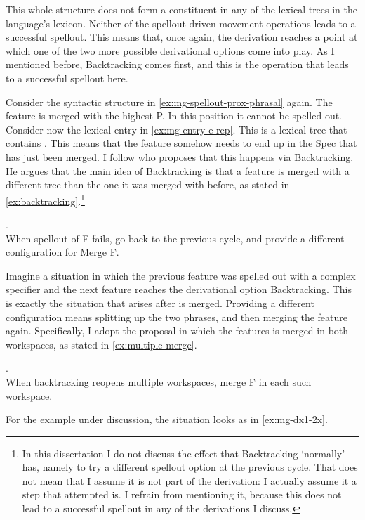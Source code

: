 This whole structure does not form a constituent in any of the lexical trees in the language's lexicon. Neither of the spellout driven movement operations leads to a successful spellout. This means that, once again, the derivation reaches a point at which one of the two more possible derivational options come into play. As I mentioned before, Backtracking comes first, and this is the operation that leads to a successful spellout here.

Consider the syntactic structure in \ref{ex:mg-spellout-prox-phrasal} again. The feature  is merged with the highest P. In this position it cannot be spelled out.
Consider now the lexical entry in \ref{ex:mg-entry-e-rep}. This is a lexical tree that contains . This means that the feature  somehow needs to end up in the Spec that has just been merged.
I follow \citet{caha2019} who proposes that this happens via Backtracking. He argues that the main idea of Backtracking is that a feature is merged with a different tree than the one it was merged with before, as stated in \ref{ex:backtracking}.\footnote{
In this dissertation I do not discuss the effect that Backtracking `normally' has, namely to try a different spellout option at the previous cycle. That does not mean that I assume it is not part of the derivation: I actually assume it a step that attempted is. I refrain from mentioning it, because this does not lead to a successful spellout in any of the derivations I discuss.
}

\ex.  \\\label{ex:backtracking}
When spellout of F fails, go back to the previous cycle, and provide a different configuration for Merge F.

Imagine a situation in which the previous feature was spelled out with a complex specifier and the next feature reaches the derivational option Backtracking. This is exactly the situation that arises after  is merged. Providing a different configuration means splitting up the two phrases, and then merging the feature again. Specifically, I adopt the proposal in which the features is merged in both workspaces, as stated in \ref{ex:multiple-merge}.

\ex.  \\\label{ex:multiple-merge}
When backtracking reopens multiple workspaces, merge F in each such workspace.

For the example under discussion, the situation looks as in \ref{ex:mg-dx1-2x}.

